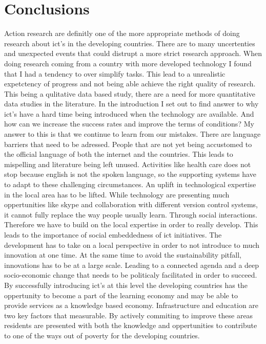 \chapter{Conclusions}
Action research are definitly one of the more appropriate methods of doing research about \gls{ict}'s in the developing countries. 
There are to many uncertenties and unexpected events that could distrupt a more strict research approach.
When doing research coming from a country with more developed technology I found that I had a tendency to over simplify tasks.
This lead to a unrealistic expetctency of progress and not being able achieve the right quality of research.
This being a qulitative data based study, there are a need for more quantitative data studies in the literature.
In the introduction I set out to find answer to why \gls{ict}'s have a hard time being introduced when the technology are available.
And how can we increase the success rates and improve the terms of conditions?
My answer to this is that we continue to learn from our mistakes.
There are language barriers that need to be adressed. 
People that are not yet being accustomed to the official language of both the internet and the countries.
This leads to mispelling and literature being left unused. 
Activities like health care does not stop because english is not the spoken language, so the supporting systems have to adapt to these challenging circumstances.
An uplift in technological expertise in the local area has to be lifted. 
While technology are presenting much oppertunities like skype and collaboration with different version control systems, it cannot fully replace the way people usually learn. Through social interactions. 
Therefore we have to build on the local expertise in order to really develop. 
This leads to the importance of social embeddedness of \gls{ict} initiatives.
The development has to take on a local perspective in order to not introduce to much innovation at one time. 
At the same time to avoid the sustainability pitfall, innovations has to be at a large scale.
Leading to a connected agenda and a deep socio-economic change that needs to be politicaly facilitated in order to succeed.
By successfully introducing \gls{ict}'s at this level the developing countries has the oppertunity to become a part of the learning economy and may be able to provide services as a knowledge based economy. 
Infrastructure and education are two key factors that measurable.
By actively commiting to improve these areas residents are presented with both the knowledge and oppertunities to contribute to one of the ways out of poverty for the developing countries. 



